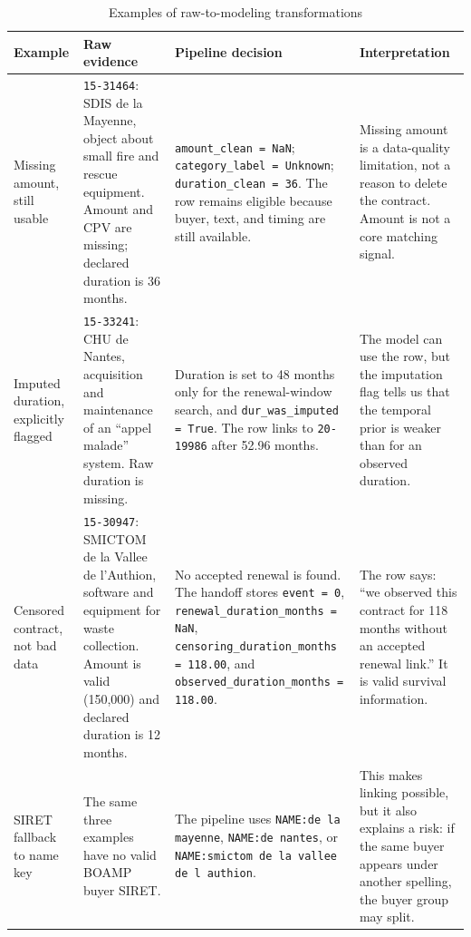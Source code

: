 \documentclass[12pt, a4paper]{article}
\begin{document}
\begin{landscape}
\begin{table}[p]
\centering
\caption{Examples of raw-to-modeling transformations}
\label{tab:dataset_examples}
\footnotesize
\begin{tabularx}{\linewidth}{@{}P{3.4cm}Y Y Y@{}}
\toprule
\textbf{Example} & \textbf{Raw evidence} & \textbf{Pipeline decision} & \textbf{Interpretation} \\
\midrule
Missing amount, still usable
& \texttt{15-31464}: SDIS de la Mayenne, object about small fire and rescue equipment. Amount and CPV are missing; declared duration is 36 months.
& \texttt{amount\_clean = NaN}; \texttt{category\_label = Unknown}; \texttt{duration\_clean = 36}. The row remains eligible because buyer, text, and timing are still available.
& Missing amount is a data-quality limitation, not a reason to delete the contract. Amount is not a core matching signal. \\[4pt]

Imputed duration, explicitly flagged
& \texttt{15-33241}: CHU de Nantes, acquisition and maintenance of an ``appel malade'' system. Raw duration is missing.
& Duration is set to 48 months only for the renewal-window search, and \texttt{dur\_was\_imputed = True}. The row links to \texttt{20-19986} after 52.96 months.
& The model can use the row, but the imputation flag tells us that the temporal prior is weaker than for an observed duration. \\[4pt]

Censored contract, not bad data
& \texttt{15-30947}: SMICTOM de la Vallee de l'Authion, software and equipment for waste collection. Amount is valid (\texteuro{}150,000) and declared duration is 12 months.
& No accepted renewal is found. The handoff stores \texttt{event = 0}, \texttt{renewal\_duration\_months = NaN}, \texttt{censoring\_duration\_months = 118.00}, and \texttt{observed\_duration\_months = 118.00}.
& The row says: ``we observed this contract for 118 months without an accepted renewal link.'' It is valid survival information. \\[4pt]

SIRET fallback to name key
& The same three examples have no valid BOAMP buyer SIRET.
& The pipeline uses \texttt{NAME:de la mayenne}, \texttt{NAME:de nantes}, or \texttt{NAME:smictom de la vallee de l authion}.
& This makes linking possible, but it also explains a risk: if the same buyer appears under another spelling, the buyer group may split. \\
\bottomrule
\end{tabularx}
\normalsize
\end{table}
\end{landscape}
\end{document}
